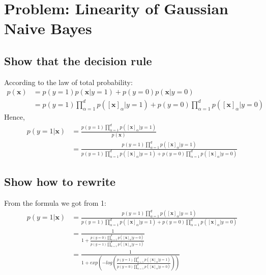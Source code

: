 \documentclass{article}
\begin{document}
	\section{Problem: Linearity of Gaussian Naive Bayes}
	\subsection{Show that the decision rule}
	According to the law of total probability:
	\[
		\begin{split}
			p(\textbf{x}) &= p(y=1)p(\textbf{x}|y=1)+p(y=0)p(\textbf{x}|y=0)\\
			&=p(y=1)\prod_{\alpha=1}^d {p([\textbf{x}]_{\alpha}|y=1)} +p(y=0)\prod_{\alpha=1}^d {p([\textbf{x}]_{\alpha}|y=0)}
		\end{split}
	\]
	Hence,
	\[
		\begin{split}
			p(y=1|\textbf{x}) &=\frac{
				p(y=1) 
				\prod_{\alpha=1}^d {
					p([\textbf{x}]_{\alpha}|y=1)
				} 
			}{
				p(\textbf{x})
			} \\
			&=\frac{
				p(y=1)\prod_{\alpha=1}^d {
					p([\textbf{x}]_{\alpha}|y=1)
				}
			}{
				p(y=1)\prod_{\alpha=1}^d {
					p([\textbf{x}]_{\alpha}|y=1)
				}
				+p(y=0)\prod_{\alpha=1}^d {
					p([\textbf{x}]_{\alpha}|y=0)
				}
			}
		\end{split}
	\]
	
	\subsection{Show how to rewrite}
	From the formula we got from 1:
	\[
		\begin{split}
			p(y=1|\textbf{x}) 
			&=\frac{
				p(y=1)\prod_{\alpha=1}^d {
					p([\textbf{x}]_{\alpha}|y=1)
				}
			}{
				p(y=1)\prod_{\alpha=1}^d {
					p([\textbf{x}]_{\alpha}|y=1)
				}
				+p(y=0)\prod_{\alpha=1}^d {
					p([\textbf{x}]_{\alpha}|y=0)
				}
			}\\
			&=\frac{1}{
				1 + \frac{
					p(y=0)\prod_{\alpha=1}^d {
						p([\textbf{x}]_{\alpha}|y=0)
					}
				}{
					p(y=1)\prod_{\alpha=1}^d {
						p([\textbf{x}]_{\alpha}|y=1)
					}
				}
			}\\
			&=\frac{1}{
				1 + exp(
					-log(
						\frac{
							p(y=1)\prod_{\alpha=1}^d {
								p([\textbf{x}]_{\alpha}|y=1)
							}
						}{
							p(y=0)\prod_{\alpha=1}^d {
								p([\textbf{x}]_{\alpha}|y=0)
							}
						}
					)
				)
			}\\
		\end{split}
	\]
\end{document}
